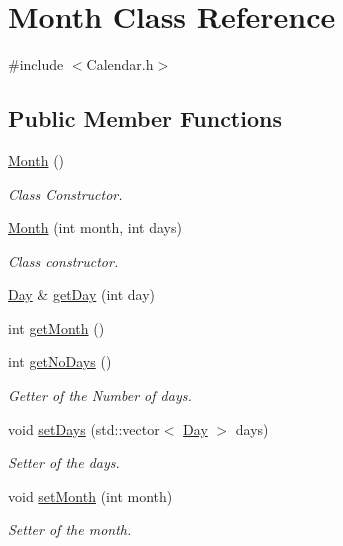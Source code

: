 \hypertarget{class_month}{}\section{Month Class Reference}
\label{class_month}


{\ttfamily \#include $<$Calendar.\+h$>$}

\subsection*{Public Member Functions}
\begin{DoxyCompactItemize}
\item 
\mbox{\hyperlink{class_month_a36882c55ece9c4210ec1b01bd665ec89}{Month}} ()
\begin{DoxyCompactList}\small\item\em Class Constructor. \end{DoxyCompactList}\item 
\mbox{\hyperlink{class_month_a4abb71ddcd1dfed172a828d8598bbdc7}{Month}} (int month, int days)
\begin{DoxyCompactList}\small\item\em Class constructor. \end{DoxyCompactList}\item 
\mbox{\hyperlink{class_day}{Day}} \& \mbox{\hyperlink{class_month_aea6a1844798c684548c1de899cf620b2}{get\+Day}} (int day)
\item 
int \mbox{\hyperlink{class_month_a5bc7c527734f8bc303fea424cd265357}{get\+Month}} ()
\item 
int \mbox{\hyperlink{class_month_a901b9af10fe3f3dab931927c2ab77440}{get\+No\+Days}} ()
\begin{DoxyCompactList}\small\item\em Getter of the Number of days. \end{DoxyCompactList}\item 
void \mbox{\hyperlink{class_month_a816bb5d0a2d54283ece6924a7b54df36}{set\+Days}} (std\+::vector$<$ \mbox{\hyperlink{class_day}{Day}} $>$ days)
\begin{DoxyCompactList}\small\item\em Setter of the days. \end{DoxyCompactList}\item 
void \mbox{\hyperlink{class_month_a9f6e8f474768770ae897e53177eb1797}{set\+Month}} (int month)
\begin{DoxyCompactList}\small\item\em Setter of the month. \end{DoxyCompactList}\end{DoxyCompactItemize}


